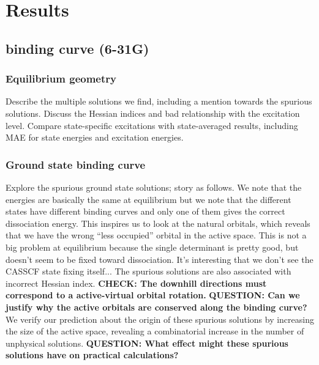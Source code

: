 \documentclass[aip,jcp,reprint,noshowkeys,superscriptaddress]{revtex4-1}
\newcommand{\hugh}[1]{\textcolor{hughgreen}{#1}}
\begin{document}
\section{Results}
\label{sec:results}

\subsection{ binding curve (6-31G)}
\label{sec:results}

\subsubsection{Equilibrium geometry}

\hugh{Describe the multiple solutions we find, including a mention towards the spurious solutions. 
Discuss the Hessian indices and bad relationship with the excitation level.
Compare state-specific excitations with state-averaged results, including MAE for state energies and excitation energies.}

\subsubsection{Ground state binding curve}

\hugh{Explore the spurious ground state solutions; story as follows. 
We note that the energies are basically the same at equilibrium but we note that the different states have different
binding curves and only one of them gives the correct dissociation energy. 
This inspires us to look at the natural orbitals, which reveals that we have the wrong ``less occupied'' orbital in the 
active space.
This is not a big problem at equilibrium because the single determinant is pretty good, but doesn't seem 
to be fixed toward dissociation. 
It's interesting that we don't see the CASSCF state fixing itself...
The spurious solutions are also associated with incorrect Hessian index. 
\textbf{CHECK: The downhill directions must correspond to a active-virtual orbital rotation.}
\textbf{QUESTION: Can we justify why the active orbitals are conserved along the binding curve?}
We verify our prediction about the origin of these spurious solutions by increasing the size of the active space,  
revealing a combinatorial increase in the number of unphysical solutions. 
\textbf{QUESTION: What effect might these spurious solutions have on practical calculations?}
}
\end{document}
